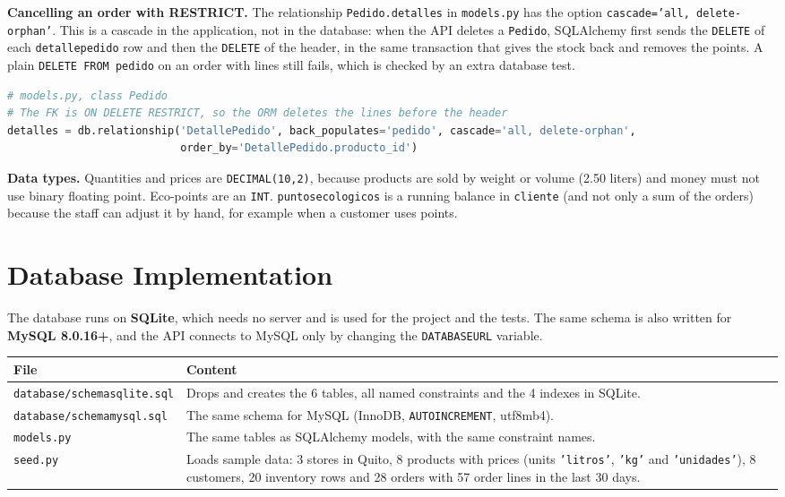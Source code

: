 \documentclass[11pt]{article}
\renewcommand{\_}{\oldus\allowbreak}
\begin{document}
\textbf{Cancelling an order with RESTRICT.} The relationship \texttt{Pedido.detalles} in
\texttt{models.py} has the option \texttt{cascade='all, delete-orphan'}. This is a cascade in the
application, not in the database: when the API deletes a \texttt{Pedido}, SQLAlchemy first sends the
\texttt{DELETE} of each \texttt{detalle\_pedido} row and then the \texttt{DELETE} of the header, in
the same transaction that gives the stock back and removes the points. A plain
\texttt{DELETE FROM pedido} on an order with lines still fails, which is checked by an extra database
test.

\begin{lstlisting}[language=Python, basicstyle=\ttfamily\scriptsize]
# models.py, class Pedido
# The FK is ON DELETE RESTRICT, so the ORM deletes the lines before the header
detalles = db.relationship('DetallePedido', back_populates='pedido', cascade='all, delete-orphan',
                           order_by='DetallePedido.producto_id')
\end{lstlisting}

\textbf{Data types.} Quantities and prices are \texttt{DECIMAL(10,2)}, because products are sold
by weight or volume (2.50 liters) and money must not use binary floating point. Eco-points are an
\texttt{INT}. \texttt{puntos\_ecologicos} is a running balance in \texttt{cliente} (and not only a
sum of the orders) because the staff can adjust it by hand, for example when a customer uses points.

\section{Database Implementation}

The database runs on \textbf{SQLite}, which needs no server and is used for the project and the
tests. The same schema is also written for \textbf{MySQL 8.0.16+}, and the API connects to MySQL
only by changing the \texttt{DATABASE\_URL} variable.

\begin{center}
\small
\begin{tabular}{>{\raggedright}p{4.6cm} p{10cm}}
\toprule
\textbf{File} & \textbf{Content} \\
\midrule
\texttt{database/schema\_sqlite.sql} & Drops and creates the 6 tables, all named constraints and the 4 indexes in SQLite. \\
\texttt{database/schema\_mysql.sql} & The same schema for MySQL (InnoDB, \texttt{AUTO\_INCREMENT}, utf8mb4). \\
\texttt{models.py} & The same tables as SQLAlchemy models, with the same constraint names. \\
\texttt{seed.py} & Loads sample data: 3 stores in Quito, 8 products with prices (units \texttt{'litros'}, \texttt{'kg'} and \texttt{'unidades'}), 8 customers, 20 inventory rows and 28 orders with 57 order lines in the last 30 days. \\
\bottomrule
\end{tabular}
\end{center}
\end{document}
